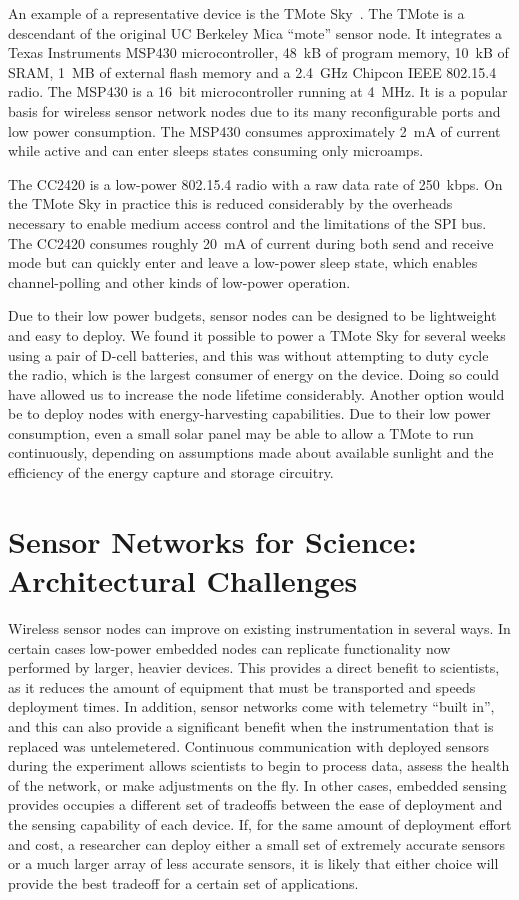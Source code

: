 An example of a representative device is the TMote Sky~\cite{moteiv}. The
TMote is a descendant of the original UC Berkeley Mica ``mote'' sensor node.
It integrates a Texas Instruments MSP430 microcontroller, 48~kB of program
memory, 10~kB of SRAM, 1~MB of external flash memory and a 2.4~GHz Chipcon
IEEE 802.15.4 radio. The MSP430 is a 16~bit microcontroller running at 4~MHz.
It is a popular basis for wireless sensor network nodes due to its many
reconfigurable ports and low power consumption. The MSP430 consumes
approximately 2~mA of current while active and can enter sleeps states
consuming only microamps.

The CC2420 is a low-power 802.15.4 radio with a raw data rate of 250~kbps. On
the TMote Sky in practice this is reduced considerably by the overheads
necessary to enable medium access control and the limitations of the SPI bus.
The CC2420 consumes roughly 20~mA of current during both send and receive
mode but can quickly enter and leave a low-power sleep state, which enables
channel-polling and other kinds of low-power operation.

Due to their low power budgets, sensor nodes can be designed to be
lightweight and easy to deploy. We found it possible to power a TMote Sky for
several weeks using a pair of D-cell batteries, and this was without
attempting to duty cycle the radio, which is the largest consumer of energy
on the device. Doing so could have allowed us to increase the node lifetime
considerably. Another option would be to deploy nodes with energy-harvesting
capabilities. Due to their low power consumption, even a small solar panel
may be able to allow a TMote to run continuously, depending on assumptions
made about available sunlight and the efficiency of the energy capture and
storage circuitry.

\section{Sensor Networks for Science: Architectural Challenges}

Wireless sensor nodes can improve on existing instrumentation in several
ways. In certain cases low-power embedded nodes can replicate functionality
now performed by larger, heavier devices. This provides a direct benefit to
scientists, as it reduces the amount of equipment that must be transported
and speeds deployment times. In addition, sensor networks come with telemetry
``built in'', and this can also provide a significant benefit when the
instrumentation that is replaced was untelemetered. Continuous communication
with deployed sensors during the experiment allows scientists to begin to
process data, assess the health of the network, or make adjustments on the
fly. In other cases, embedded sensing provides occupies a different set of
tradeoffs between the ease of deployment and the sensing capability of each
device. If, for the same amount of deployment effort and cost, a researcher
can deploy either a small set of extremely accurate sensors or a much larger
array of less accurate sensors, it is likely that either choice will provide
the best tradeoff for a certain set of applications.

